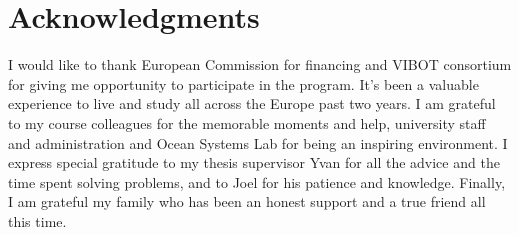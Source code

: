 \doublespacing

\setcounter{page}{1} \pagestyle{plain}


\tableofcontents

\listoffigures
\listoftables

\chapter*{Acknowledgments}
         {\protect{}}

I would like to thank European Commission for financing and VIBOT consortium for giving me opportunity to participate in the program. It's been a valuable experience to live and study all across the Europe past two years. I am grateful to my course colleagues for the memorable moments and help, university staff and administration and Ocean Systems Lab for being an inspiring environment. I express special gratitude to my thesis supervisor Yvan for all the advice and the time spent solving problems,  and to Joel for his patience and knowledge.  
Finally, I am grateful my family who has been an honest support and a true friend all this time.       
\pagestyle{fancy}
